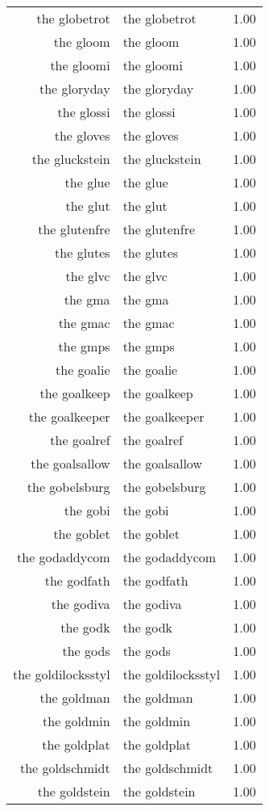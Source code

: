 \begin{table}[ht]
\begin{tabular}{rlr}
  the globetrot & the globetrot & 1.00 \\ 
  the gloom & the gloom & 1.00 \\ 
  the gloomi & the gloomi & 1.00 \\ 
  the gloryday & the gloryday & 1.00 \\ 
  the glossi & the glossi & 1.00 \\ 
  the gloves & the gloves & 1.00 \\ 
  the gluckstein & the gluckstein & 1.00 \\ 
  the glue & the glue & 1.00 \\ 
  the glut & the glut & 1.00 \\ 
  the glutenfre & the glutenfre & 1.00 \\ 
  the glutes & the glutes & 1.00 \\ 
  the glvc & the glvc & 1.00 \\ 
  the gma & the gma & 1.00 \\ 
  the gmac & the gmac & 1.00 \\ 
  the gmps & the gmps & 1.00 \\ 
  the goalie & the goalie & 1.00 \\ 
  the goalkeep & the goalkeep & 1.00 \\ 
  the goalkeeper & the goalkeeper & 1.00 \\ 
  the goalref & the goalref & 1.00 \\ 
  the goalsallow & the goalsallow & 1.00 \\ 
  the gobelsburg & the gobelsburg & 1.00 \\ 
  the gobi & the gobi & 1.00 \\ 
  the goblet & the goblet & 1.00 \\ 
  the godaddycom & the godaddycom & 1.00 \\ 
  the godfath & the godfath & 1.00 \\ 
  the godiva & the godiva & 1.00 \\ 
  the godk & the godk & 1.00 \\ 
  the gods & the gods & 1.00 \\ 
  the goldilocksstyl & the goldilocksstyl & 1.00 \\ 
  the goldman & the goldman & 1.00 \\ 
  the goldmin & the goldmin & 1.00 \\ 
  the goldplat & the goldplat & 1.00 \\ 
  the goldschmidt & the goldschmidt & 1.00 \\ 
  the goldstein & the goldstein & 1.00 \\ 

\end{tabular}
\end{table}
